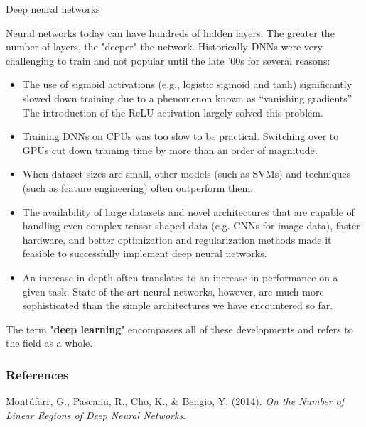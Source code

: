 \documentclass[11pt,compress,t,notes=noshow, xcolor=table]{beamer}
\begin{document}
\begin{vbframe}{Deep neural networks}

Neural networks today can have %
hundreds of hidden layers. The greater the number of layers, the "deeper" the network. Historically %
DNNs were very challenging to train and not popular until the late '00s for several reasons:
\lz
\begin{itemize}
\item %
The use of sigmoid activations (e.g., logistic sigmoid and tanh) significantly slowed down training due to a phenomenon known as \enquote{vanishing gradients}. The introduction of the ReLU activation largely solved this problem.
\item Training DNNs on CPUs was too slow to be practical. Switching over to GPUs cut down training time by more than an order of magnitude.
\item When dataset sizes are small, other models (such as SVMs) and techniques (such as feature engineering) often outperform them. 
\end{itemize}
\framebreak
\begin{itemize}
\item The availability of large datasets and novel architectures that are capable of handling even complex tensor-shaped data (e.g. CNNs for image data), faster hardware, and better optimization and regularization methods made it feasible to successfully implement deep neural networks.%
\lz

\item An increase in depth often translates to an increase in performance on a given task. State-of-the-art neural networks, however, are much more sophisticated than the simple architectures we have encountered so far.

\lz
\end{itemize}
The term "\textbf{deep learning}" encompasses all of these developments and refers to the field as a whole.
\end{vbframe}
\begin{vbframe}
\frametitle{References}
\footnotesize{
\begin{thebibliography}{99}
 Mont\'{u}farr, G., Pascanu, R., Cho, K., \& Bengio, Y. (2014). \textit{On the Number of Linear Regions of Deep Neural Networks}. 
\end{thebibliography}
}
\end{vbframe}
\endlecture
\end{document}
